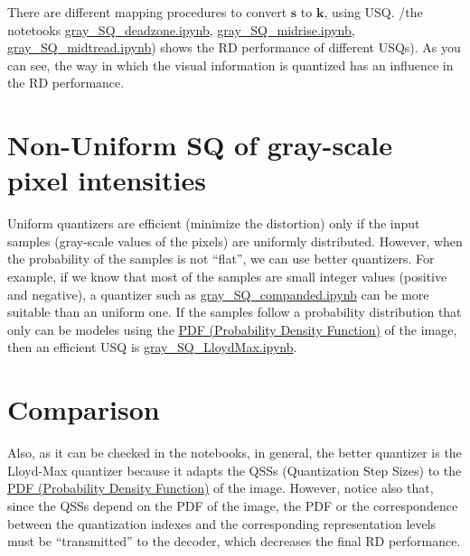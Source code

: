 There are different mapping procedures to convert $\mathbf{s}$ to
$\mathbf{k}$, using USQ. /the notetooks
\href{https://github.com/Sistemas-Multimedia/Sistemas-Multimedia.github.io/blob/master/contents/gray_SQ/gray_SQ_deadzone.ipynb}{gray\_SQ\_deadzone.ipynb},
\href{https://github.com/Sistemas-Multimedia/Sistemas-Multimedia.github.io/blob/master/contents/gray_SQ/gray_SQ_midrise.ipynb}{gray\_SQ\_midrise.ipynb},
\href{https://github.com/Sistemas-Multimedia/Sistemas-Multimedia.github.io/blob/master/contents/gray_SQ/gray_SQ_midtread.ipynb}{gray\_SQ\_midtread.ipynb})
shows the RD performance of different USQs). As you can see, the way
in which the visual information is quantized has an influence in the
RD performance.

\section{Non-Uniform SQ of gray-scale pixel intensities}
Uniform quantizers are efficient (minimize the distortion) only if the
input samples (gray-scale values of the pixels) are uniformly
distributed. However, when the probability of the samples is not
``flat'', we can use better quantizers. For example, if we know that
most of the samples are small integer values (positive and negative),
a quantizer such as
\href{https://github.com/Sistemas-Multimedia/Sistemas-Multimedia.github.io/blob/master/contents/gray_SQ/gray_SQ_companded.ipynb}{gray\_SQ\_companded.ipynb}
can be more suitable than an uniform one. If the samples follow a
probability distribution that only can be modeles using the
\href{https://en.wikipedia.org/wiki/Probability_density_function}{PDF
  (Probability Density Function)} of the image, then an efficient USQ
is
\href{https://github.com/Sistemas-Multimedia/Sistemas-Multimedia.github.io/blob/master/contents/gray_SQ/gray_SQ_LloydMax.ipynb}{gray\_SQ\_LloydMax.ipynb}.

\section{Comparison}

 Also, as it can be checked in the notebooks, in
general, the better quantizer is the Lloyd-Max quantizer because it
adapts the QSSs (Quantization Step Sizes) to the
\href{https://en.wikipedia.org/wiki/Probability_density_function}{PDF
  (Probability Density Function)} of the image. However, notice also
that, since the QSSs depend on the PDF of the image, the PDF or the
correspondence between the quantization indexes and the corresponding
representation levels must be ``transmitted'' to the decoder, which
decreases the final RD performance.

